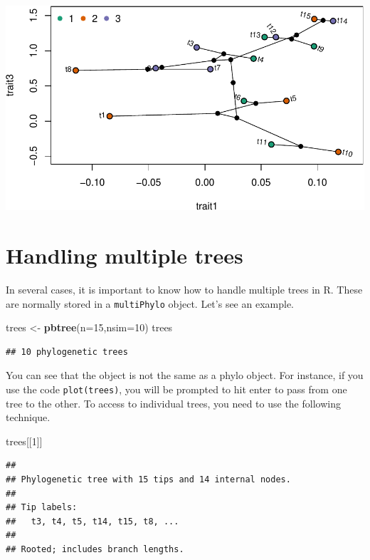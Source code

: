 \documentclass[
]{book}
\newenvironment{Shaded}{\begin{snugshade}}{\end{snugshade}}
\newcommand{\AttributeTok}[1]{\textcolor[rgb]{0.13,0.29,0.53}{#1}}
\newcommand{\DecValTok}[1]{\textcolor[rgb]{0.00,0.00,0.81}{#1}}
\newcommand{\FunctionTok}[1]{\textcolor[rgb]{0.13,0.29,0.53}{\textbf{#1}}}
\newcommand{\NormalTok}[1]{#1}
\newcommand{\OtherTok}[1]{\textcolor[rgb]{0.56,0.35,0.01}{#1}}
\begin{document}
\includegraphics{pcm-workshop_files/figure-latex/Phylomorphospace-1.pdf}

\section{Handling multiple trees}\label{handling-multiple-trees}

In several cases, it is important to know how to handle multiple trees in R. These are normally stored in a \texttt{multiPhylo} object. Let's see an example.

\begin{Shaded}
\begin{Highlighting}[]
\NormalTok{trees }\OtherTok{\textless{}{-}} \FunctionTok{pbtree}\NormalTok{(}\AttributeTok{n=}\DecValTok{15}\NormalTok{,}\AttributeTok{nsim=}\DecValTok{10}\NormalTok{)}
\NormalTok{trees}
\end{Highlighting}
\end{Shaded}

\begin{verbatim}
## 10 phylogenetic trees
\end{verbatim}

You can see that the object is not the same as a phylo object. For instance, if you use the code \texttt{plot(trees)}, you will be prompted to hit enter to pass from one tree to the other. To access to individual trees, you need to use the following technique.

\begin{Shaded}
\begin{Highlighting}[]
\NormalTok{trees[[}\DecValTok{1}\NormalTok{]]}
\end{Highlighting}
\end{Shaded}

\begin{verbatim}
## 
## Phylogenetic tree with 15 tips and 14 internal nodes.
## 
## Tip labels:
##   t3, t4, t5, t14, t15, t8, ...
## 
## Rooted; includes branch lengths.
\end{verbatim}
\end{document}
